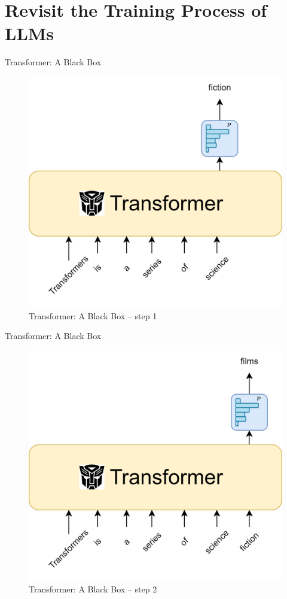 \documentclass[scheme=plain]{ctexbeamer}
\begin{document}
\section[Training process of LLMs]{Revisit the Training Process of LLMs}
\begin{frame}{Transformer: A Black Box}
  \begin{figure}
      \includegraphics[width=.6\linewidth]{transformer_black_box.drawio.png}
      \caption[]{Transformer: A Black Box -- step 1}
  \end{figure}
\end{frame}
\begin{frame}{Transformer: A Black Box}
  \begin{figure}
      \includegraphics[width=.6\linewidth]{transformer_black_box_step_2.drawio.png}
      \caption[]{Transformer: A Black Box -- step 2}
  \end{figure}
\end{frame}
\end{document}
